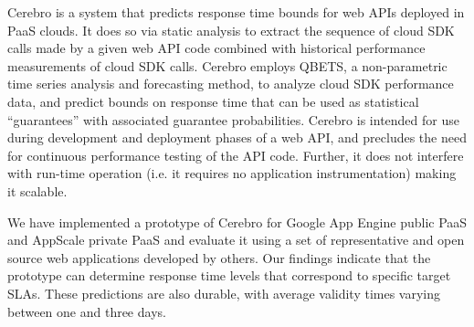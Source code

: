 
Cerebro is a system that predicts response time 
bounds for web APIs deployed in PaaS clouds.  It does so via 
static analysis to extract the sequence of cloud SDK 
calls made by a given web API code combined with
historical performance measurements of cloud SDK calls. 
Cerebro employs QBETS, a non-parametric time series analysis and 
forecasting method, to analyze
cloud SDK performance data, and predict bounds
on response time that can be used as statistical ``guarantees'' with
associated guarantee probabilities.
Cerebro is intended for use during development and 
deployment phases of a web API, and 
precludes the need for continuous performance testing of the API code. 
Further, it does not interfere with run-time operation (i.e. it requires
no application instrumentation) making it scalable.

We have implemented a prototype of Cerebro for Google App Engine public PaaS
and AppScale private PaaS
and evaluate it using a set of representative
and open source web applications developed by others.  
Our findings indicate that the prototype can determine response time levels
that correspond to specific target SLAs.  These predictions are also durable,
with average validity times varying between one and three days.

